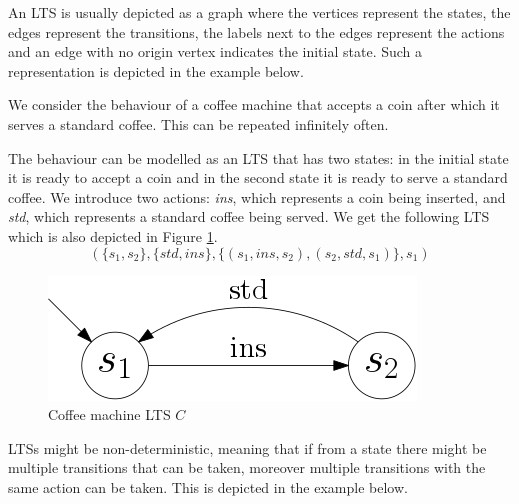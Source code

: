 An LTS is usually depicted as a graph where the vertices represent the states, the edges represent the transitions, the labels next to the edges represent the actions and an edge with no origin vertex indicates the initial state. Such a representation is depicted in the example below.
\begin{example}
	We consider the behaviour of a coffee machine that accepts a coin after which it serves a standard coffee. This can be repeated infinitely often. 
	
	The behaviour can be modelled as an LTS that has two states: in the initial state it is ready to accept a coin and in the second state it is ready to serve a standard coffee. We introduce two actions: \textit{ins}, which represents a coin being inserted, and \textit{std}, which represents a standard coffee being served. We get the following LTS which is also depicted in Figure \ref{fig:coffeemachinebasiceurolts}.
	\[ (\{s_1,s_2\},\{std,ins\},\{(s_1,ins,s_2),(s_2,std,s_1)\},s_1)\]
	\begin{figure}[h]
		\centering
		\includegraphics[scale=0.3]{Examples/CoffeeMachine/BasicEuroLTS}
		\caption[Coffee machine LTS]{Coffee machine LTS $C$}
		\label{fig:coffeemachinebasiceurolts}
	\end{figure}
\end{example}

LTSs might be non-deterministic, meaning that if from a state there might be multiple transitions that can be taken, moreover multiple transitions with the same action can be taken. This is depicted in the example below.

